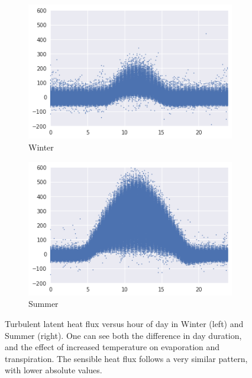 \documentclass[a4paper]{book}
\begin{document}
\begin{figure}
    \centering
    \begin{subfigure}[t]{0.48\textwidth}
        \centering
        \includegraphics[width=\textwidth]{images/le_winter}
        \caption{Winter}
        \label{fig:le_winter}
    \end{subfigure}
    \hfill
    \begin{subfigure}[t]{0.48\textwidth}
        \centering
        \includegraphics[width=\textwidth]{images/le_summer}
        \caption{Summer}
        \label{fig:le_summer}
    \end{subfigure}
    \caption{Turbulent latent heat flux versus hour of day in Winter (left) and Summer (right). One can see both the difference in day duration, and the effect of increased temperature on evaporation and transpiration. The sensible heat flux follows a very similar pattern, with lower absolute values.}
	\label{fig:le_season}
\end{figure}
\end{document}
